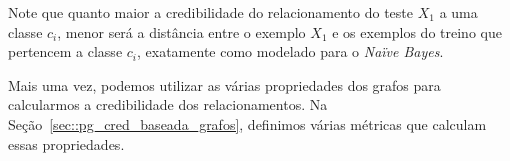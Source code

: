 Note que quanto maior a credibilidade do relacionamento do teste $X_1$ a uma classe $c_i$, menor será a distância entre o exemplo $X_1$ e os exemplos do treino que pertencem a classe $c_i$, exatamente como modelado para o \textit{Naïve Bayes}.

Mais uma vez, podemos utilizar as várias propriedades dos grafos para calcularmos a credibilidade dos relacionamentos. Na Seção~\ref{sec::pg_cred_baseada_grafos}, definimos várias métricas que calculam essas propriedades. 

